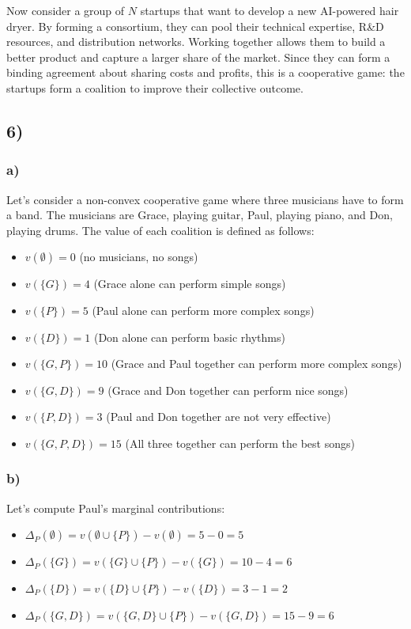 \documentclass[10pt]{article}
\begin{document}
Now consider a group of $N$ startups that want to develop a new AI-powered hair dryer. By forming a consortium, they can pool their technical expertise, R\&D resources, and distribution networks. Working together allows them to build a better product and capture a larger share of the market. Since they can form a binding agreement about sharing costs and profits, this is a cooperative game: the startups form a coalition to improve their collective outcome.

\subsection*{6)}

\subsubsection*{a)}

Let's consider a non-convex cooperative game where three musicians have to form a band. The musicians are Grace, playing guitar, Paul, playing piano, and Don, playing drums. The value of each coalition is defined as follows:

\begin{itemize}
\item $v(\emptyset) = 0$ (no musicians, no songs)
\item $v(\{G\}) = 4$ (Grace alone can perform simple songs)
\item $v(\{P\}) = 5$ (Paul alone can perform more complex songs)
\item $v(\{D\}) = 1$ (Don alone can perform basic rhythms)
\item $v(\{G,P\}) = 10$ (Grace and Paul together can perform more complex songs)
\item $v(\{G,D\}) = 9$ (Grace and Don together can perform nice songs)
\item $v(\{P,D\}) = 3$ (Paul and Don together are not very effective)
\item $v(\{G,P,D\}) = 15$ (All three together can perform the best songs)
\end{itemize}

\subsubsection*{b)}

Let's compute Paul's marginal contributions:
\begin{itemize}
\item $\Delta_{P}(\emptyset) = v(\emptyset \cup \{P\}) - v(\emptyset) = 5 - 0 = 5$
\item $\Delta_{P}(\{G\}) = v(\{G\} \cup \{P\}) - v(\{G\}) = 10 - 4 = 6$
\item $\Delta_{P}(\{D\}) = v(\{D\} \cup \{P\}) - v(\{D\}) = 3 - 1 = 2$
\item $\Delta_{P}(\{G,D\}) = v(\{G,D\} \cup \{P\}) - v(\{G,D\}) = 15 - 9 = 6$
\end{itemize}
\end{document}
